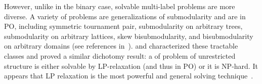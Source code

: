 However, unlike in the binary case, solvable multi-label problems are more diverse. A variety of problems are generalizations of submodularity and are in PO, including symmetric tournament pair, submodularity on arbitrary trees, submodularity on arbitrary lattices, skew bisubmodularity, and bisubmodularity on arbitrary domains (see references in~\cite{Thapper-13}).
\citet{Thapper-12} and \citet{Kolmogorov-12-LP-power} characterized these tractable classes and proved a similar dichotomy result: a of problem of unrestricted structure is either solvable by LP-relaxation (and thus in PO) or it is NP-hard. It appears that LP relaxation is the most powerful and general solving technique~\cite{Zivny-Werner-Prusa-ASP-MIT2014}.
%

